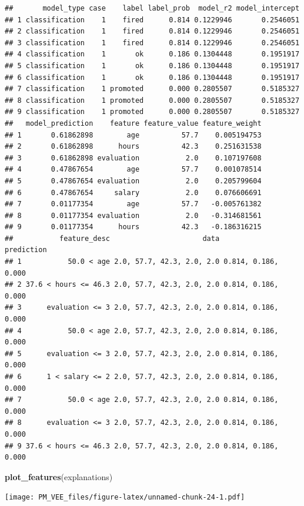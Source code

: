 \documentclass[]{krantz}
\newenvironment{Shaded}{\begin{snugshade}}{\end{snugshade}}
\newcommand{\KeywordTok}[1]{\textcolor[rgb]{0.13,0.29,0.53}{\textbf{#1}}}
\newcommand{\NormalTok}[1]{#1}
\theoremstyle{definition}
\theoremstyle{definition}
\theoremstyle{definition}
\theoremstyle{remark}
\begin{document}
\begin{verbatim}
##       model_type case    label label_prob  model_r2 model_intercept
## 1 classification    1    fired      0.814 0.1229946       0.2546051
## 2 classification    1    fired      0.814 0.1229946       0.2546051
## 3 classification    1    fired      0.814 0.1229946       0.2546051
## 4 classification    1       ok      0.186 0.1304448       0.1951917
## 5 classification    1       ok      0.186 0.1304448       0.1951917
## 6 classification    1       ok      0.186 0.1304448       0.1951917
## 7 classification    1 promoted      0.000 0.2805507       0.5185327
## 8 classification    1 promoted      0.000 0.2805507       0.5185327
## 9 classification    1 promoted      0.000 0.2805507       0.5185327
##   model_prediction    feature feature_value feature_weight
## 1       0.61862898        age          57.7    0.005194753
## 2       0.61862898      hours          42.3    0.251631538
## 3       0.61862898 evaluation           2.0    0.107197608
## 4       0.47867654        age          57.7    0.001078514
## 5       0.47867654 evaluation           2.0    0.205799604
## 6       0.47867654     salary           2.0    0.076606691
## 7       0.01177354        age          57.7   -0.005761382
## 8       0.01177354 evaluation           2.0   -0.314681561
## 9       0.01177354      hours          42.3   -0.186316215
##           feature_desc                      data          prediction
## 1           50.0 < age 2.0, 57.7, 42.3, 2.0, 2.0 0.814, 0.186, 0.000
## 2 37.6 < hours <= 46.3 2.0, 57.7, 42.3, 2.0, 2.0 0.814, 0.186, 0.000
## 3      evaluation <= 3 2.0, 57.7, 42.3, 2.0, 2.0 0.814, 0.186, 0.000
## 4           50.0 < age 2.0, 57.7, 42.3, 2.0, 2.0 0.814, 0.186, 0.000
## 5      evaluation <= 3 2.0, 57.7, 42.3, 2.0, 2.0 0.814, 0.186, 0.000
## 6      1 < salary <= 2 2.0, 57.7, 42.3, 2.0, 2.0 0.814, 0.186, 0.000
## 7           50.0 < age 2.0, 57.7, 42.3, 2.0, 2.0 0.814, 0.186, 0.000
## 8      evaluation <= 3 2.0, 57.7, 42.3, 2.0, 2.0 0.814, 0.186, 0.000
## 9 37.6 < hours <= 46.3 2.0, 57.7, 42.3, 2.0, 2.0 0.814, 0.186, 0.000
\end{verbatim}

\begin{Shaded}
\begin{Highlighting}[]
\KeywordTok{plot_features}\NormalTok{(explanations)}
\end{Highlighting}
\end{Shaded}

\texttt{[image: PM\_VEE\_files/figure-latex/unnamed-chunk-24-1.pdf]}
\end{document}
